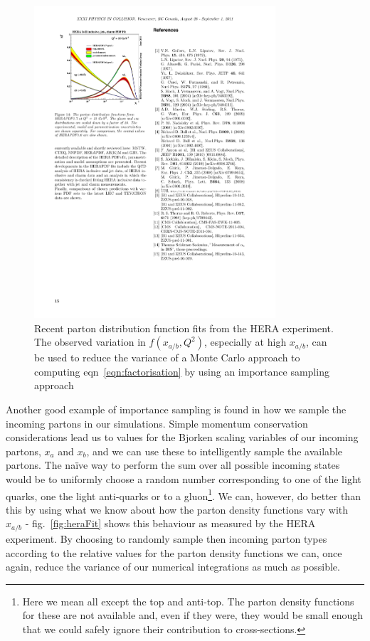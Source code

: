 	\begin{figure}[hbt]
		\centering
		\includegraphics[width=0.8\textwidth, height=0.6\textwidth]{HERAFit}
		\caption{Recent parton distribution function fits from the HERA experiment.  The observed variation in $f(x_{a/b}, Q^2)$, especially at high
		         $x_{a/b}$, can be used to reduce the variance of a Monte Carlo approach to computing eqn~\eqref{eqn:factorisation} by using an
		         importance sampling approach}
		\label{fig:heraFit}
  	\end{figure}

  	Another good example of importance sampling is found in how we sample the incoming partons in our simulations.  Simple momentum
  	conservation considerations lead us to values for the Bjorken scaling variables of our incoming partons, $x_a$ and $x_b$, and we
  	can use these to intelligently sample the available partons.  The na\"ive way to perform the sum over all possible incoming states
  	would be to uniformly choose a random number corresponding to one of the light quarks, one the light anti-quarks or to a
  	gluon\footnote{Here we mean all except the top and anti-top.  The parton density functions for these are not available
  	and, even if they were, they would be small enough that we could safely ignore their contribution to cross-sections.}.  We can,
  	however, do better than this by using what we know about how the parton density functions vary with $x_{a/b}$ - fig.~\eqref{fig:heraFit}
  	shows this behaviour as measured by the HERA experiment.  By choosing to randomly sample then incoming parton types according to the relative values
  	for the parton density functions we can, once again, reduce the variance of our numerical integrations as much as possible.

